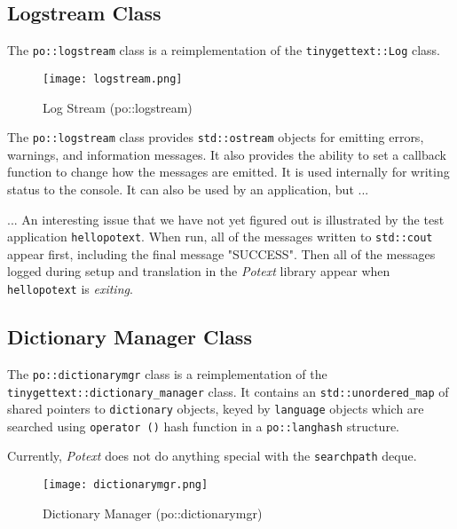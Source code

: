 \subsection{Logstream Class}
\label{subsec:potext_logstream_class}

   The \texttt{po::logstream} class is a reimplementation of the
   \texttt{tinygettext::Log} class.

\begin{figure}[H]
   \centering 
   \texttt{[image: logstream.png]}
   \caption{Log Stream (po::logstream)}
   \label{fig:potext_logstream}
\end{figure}

   The \texttt{po::logstream} class provides \texttt{std::ostream}
   objects for emitting errors, warnings, and information messages.
   It also provides the ability to set a callback function to
   change how the messages are emitted.
   It is used internally for writing status to the console.
   It can also be used by an application, but ...

   ... An interesting issue that we have not yet figured out is
   illustrated by the test application \texttt{hellopotext}.
   When run, all of the messages written to \texttt{std::cout}
   appear first, including the final message "SUCCESS".
   Then all of the messages logged during setup and translation in the
   \textsl{Potext} library appear when \texttt{hellopotext}
   is \textsl{exiting}.

\subsection{Dictionary Manager Class}
\label{subsec:potext_dictionarymgr_class}

   The \texttt{po::dictionarymgr} class is a reimplementation of the
   \texttt{tinygettext::dictionary\_manager} class.
   It contains an \texttt{std::unordered\_map} of
   shared pointers to \texttt{dictionary} objects, keyed by
   \texttt{language} objects which are searched using
   \texttt{operator ()} hash function in a \texttt{po::langhash}
   structure.

   Currently, \textsl{Potext} does not do anything special with the
   \texttt{searchpath} deque.


\begin{figure}[H]
   \centering 
   \texttt{[image: dictionarymgr.png]}
   \caption{Dictionary Manager (po::dictionarymgr)}
   \label{fig:potext_dictionarymgr}
\end{figure}

